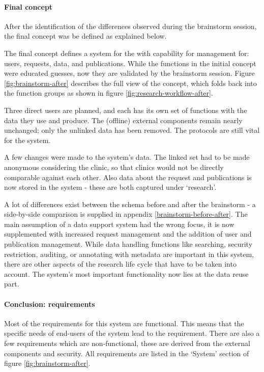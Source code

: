 \paragraph{Final concept}

After the identification of the differences observed during the brainstorm session, the final concept was be defined as explained below.

The final concept defines a system for the \projectdata{} with capability for management for: users, requests, data, and publications.
While the functions in the initial concept were educated guesses, now they are validated by the brainstorm session.
Figure \ref{fig:brainstorm-after} describes the full view of the concept, which folds back into the function groups as shown in figure \ref{fig:research-workflow-after}.

Three direct users are planned, and each has its own set of functions with the data they use and produce.
The (offline) external components remain nearly unchanged; only the unlinked data has been removed. 
The protocols are still vital for the system.

A few changes were made to the system's data.
The linked set had to be made anonymous considering the clinic, so that clinics would not be directly comparable against each other.
Also data about the request and publications is now stored in the system - these are both captured under `research'.

A lot of differences exist between the schema before and after the brainstorm - a side-by-side comparison is supplied in appendix \ref{brainstorm-before-after}.
The main assumption of a data support system had the wrong focus, it is now supplemented with increased request management and the addition of user and publication management.
While data handling functions like searching, security restriction, auditing, or annotating with metadata are important in this system, there are other aspects of the research life cycle that have to be taken into account.
The system's most important functionality now lies at the data reuse part.

\paragraph{Conclusion: requirements}
Most of the requirements for this system are functional.
This means that the specific needs of end-users of the system lead to the requirement.
There are also a few requirements which are non-functional, these are derived from the external components and security.
All requirements are listed in the `System' section of figure \ref{fig:brainstorm-after}.

